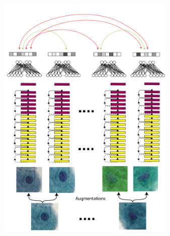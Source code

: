 \documentclass{beamer}
\begin{document}
\begin{frame}
\begin{columns}
\begin{column}{0.5\textwidth}
\end{column}
\begin{column}{0.5\textwidth}  %
\begin{center}
\begin{itemize}
    \begin{figure}
        \includegraphics[width=0.8\textwidth]{figures/contastivelearning.pdf}
    \caption{}
    \end{figure}
\end{itemize}
\end{center}
\end{column}
\end{columns}
\end{frame}


\end{document}
